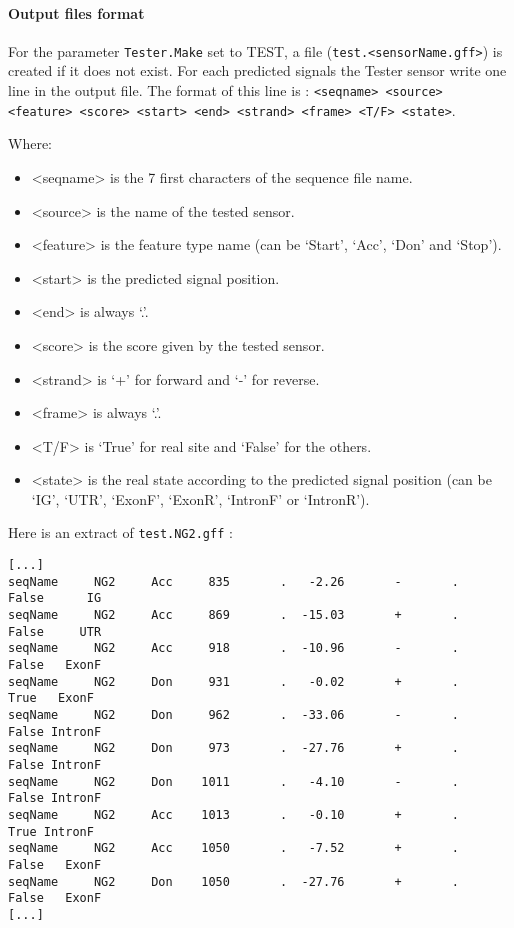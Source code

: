 \paragraph{Output files format}

For the parameter \texttt{Tester.Make} set to TEST, a file
(\texttt{test.<sensorName.gff>}) is created if it does not exist.  For each
predicted signals the Tester sensor write one line in the output file.
The format of this line is : \texttt{<seqname> <source> <feature>
  <score>
  <start> <end> <strand> <frame> <T/F> <state>}.

Where:
\begin{itemize}
\item <seqname> is the 7 first characters of the sequence file name.
\item <source> is the name of the tested sensor.
\item <feature> is the feature type name (can be `Start', `Acc', `Don' and
`Stop').
\item <start> is the predicted signal position.
\item <end> is always `.'.
\item <score> is the score given by the tested sensor.
\item <strand> is `+' for forward and `-' for reverse.
\item <frame> is always `.'.
\item <T/F> is `True' for real site and `False' for the others.
\item <state> is the real state according to the predicted signal
  position (can
  be `IG', `UTR', `ExonF', `ExonR', `IntronF' or `IntronR').
\end{itemize}
Here is an extract of \texttt{test.NG2.gff} :
\begin{Verbatim}[fontsize=\small]
[...]
seqName     NG2     Acc     835       .   -2.26       -       .   False      IG
seqName     NG2     Acc     869       .  -15.03       +       .   False     UTR
seqName     NG2     Acc     918       .  -10.96       -       .   False   ExonF
seqName     NG2     Don     931       .   -0.02       +       .    True   ExonF
seqName     NG2     Don     962       .  -33.06       -       .   False IntronF
seqName     NG2     Don     973       .  -27.76       +       .   False IntronF
seqName     NG2     Don    1011       .   -4.10       -       .   False IntronF
seqName     NG2     Acc    1013       .   -0.10       +       .    True IntronF
seqName     NG2     Acc    1050       .   -7.52       +       .   False   ExonF
seqName     NG2     Don    1050       .  -27.76       +       .   False   ExonF
[...]
\end{Verbatim}

